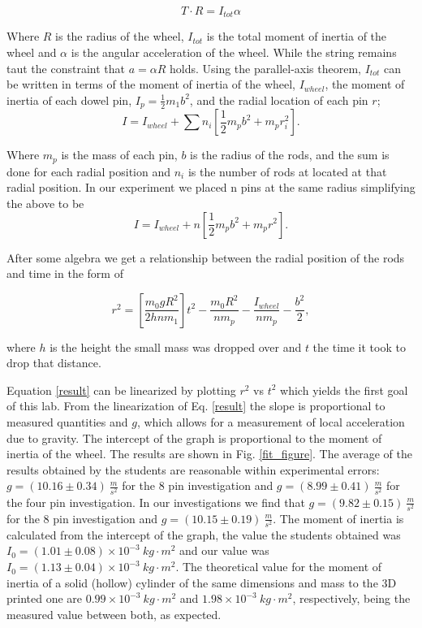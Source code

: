 \documentclass[prb,preprint]{revtex4-1}
\begin{document}
\begin{equation}
T\cdot R=I_{tot}\alpha
\end{equation}

Where $R$ is the radius of the wheel, $I_{tot}$ is the total moment of inertia of the wheel and $\alpha$ is the angular acceleration of the wheel.  While the string remains taut the constraint that $a =\alpha R$ holds.  Using the parallel-axis theorem, $I_{tot}$ can be written in terms of the moment of inertia of the wheel, $I_{wheel}$, the moment of inertia of each dowel pin, $I_{p}=\frac{1}{2}m_1b^2$, and the radial location of each pin $r$;
\begin{equation}
I=I_{wheel}+\sum n_i \left[  \frac{1}{2}m_{p}b^2+m_{p}r_i^2 \right].
\end{equation}

Where $m_p$ is the mass of each pin, $b$ is the radius of the rods, and the sum is done for each radial position and $n_i$ is the number of rods at located at that radial position.  In our experiment we placed n pins at the same radius simplifying the above to be
\begin{equation}
I=I_{wheel}+ n\left[  \frac{1}{2}m_{p}b^2+m_{p}r^2 \right].
\end{equation}

After some algebra we get a relationship between the radial position of the rods and time in the form of

\begin{equation}
r^2 = \left[\frac{m_0gR^2}{2hnm_1}\right]t^2-\frac{m_0R^2}{nm_p}-\frac{I_{wheel}}{nm_p}-\frac{b^2}{2},
\label{result}
\end{equation}

where $h$ is the height the small mass was dropped over and $t$ the time it took to drop that distance. 

Equation \ref{result} can be linearized by plotting $r^2$ vs $t^2$ which yields the first goal of this lab.  From the linearization of Eq. \ref{result} the slope is proportional to measured quantities and $g$, which allows for a measurement of local acceleration due to gravity.  The intercept of the graph is proportional to the moment of inertia of the wheel.   The results are shown in Fig. \ref{fit_figure}. The average of the results obtained by the students are reasonable within experimental errors: $g=(10.16\pm0.34)~\frac{m}{s^2}$ for the 8 pin investigation and $g=(8.99\pm0.41)~\frac{m}{s^2}$ for the four pin investigation.  In our investigations we find that $g=(9.82\pm0.15)~\frac{m}{s^2}$ for the 8 pin investigation and $g=(10.15\pm0.19)~\frac{m}{s^2}$.   The moment of inertia is calculated from the intercept of the graph, the value the students obtained was $I_0=(1.01\pm0.08)\times10^{-3}~kg\cdot m^2$ and our value was $I_0=(1.13\pm0.04)\times10^{-3}~kg\cdot m^2$. The theoretical value for the moment of inertia of a solid (hollow) cylinder of the same dimensions and mass to the 3D printed one are $0.99\times10^{-3}~kg\cdot m^2$ and $1.98\times10^{-3}~kg\cdot m^2$, respectively, being the measured value between both, as expected.
\end{document}
